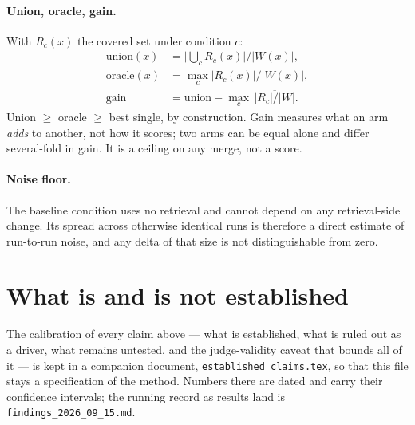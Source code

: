 \documentclass[11pt]{article}
\begin{document}
\paragraph{Union, oracle, gain.} With $R_c(x)$ the covered set under condition
$c$:
\begin{align*}
  \mathrm{union}(x)  &= \Big|\textstyle\bigcup_c R_c(x)\Big| \big/ |W(x)|, \\
  \mathrm{oracle}(x) &= \max_c |R_c(x)| \big/ |W(x)|, \\
  \mathrm{gain}      &= \overline{\mathrm{union}} - \max_c\, \overline{|R_c|/|W|}.
\end{align*}
Union $\ge$ oracle $\ge$ best single, by construction. Gain measures what an arm
\emph{adds} to another, not how it scores; two arms can be equal alone and
differ several-fold in gain. It is a ceiling on any merge, not a score.

\paragraph{Noise floor.} The baseline condition uses no retrieval and cannot
depend on any retrieval-side change. Its spread across otherwise identical runs
is therefore a direct estimate of run-to-run noise, and any delta of that size
is not distinguishable from zero.

\section{What is and is not established}

The calibration of every claim above --- what is established, what is ruled out
as a driver, what remains untested, and the judge-validity caveat that bounds all
of it --- is kept in a companion document, \texttt{established\_claims.tex}, so
that this file stays a specification of the method. Numbers there are dated and
carry their confidence intervals; the running record as results land is
\texttt{findings\_2026\_09\_15.md}.
\end{document}
